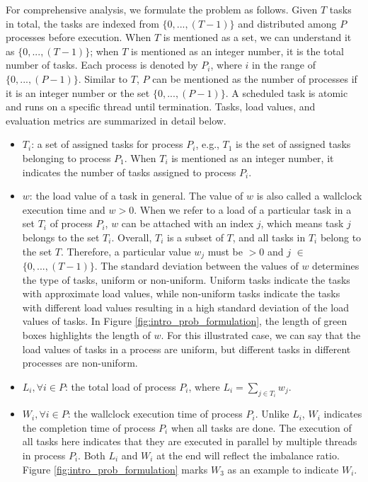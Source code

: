 For comprehensive analysis, we formulate the problem as follows. Given $T$ tasks in total, the tasks are indexed from $\{0,...,(T-1)\}$ and distributed among $P$ processes before execution. When $T$ is mentioned as a set, we can understand it as $\{0,...,(T-1)\}$; when $T$ is mentioned as an integer number, it is the total number of tasks. Each process is denoted by $P_{i}$, where $i$ in the range of $\{0,...,(P-1)\}$. Similar to $T$, $P$ can be mentioned as the number of processes if it is an integer number or the set $\{0,...,(P-1)\}$. A scheduled task is atomic and runs on a specific thread until termination. Tasks, load values, and evaluation metrics are summarized in detail below.
\begin{itemize}
	\item $T_{i}$: a set of assigned tasks for process $P_{i}$, e.g., $T_{1}$ is the set of assigned tasks belonging to process $P_{1}$. When $T_{i}$ is mentioned as an integer number, it indicates the number of tasks assigned to process $P_{i}$.

	\item $w$: the load value of a task in general. The value of $w$ is also called a wallclock execution time and $w > 0$. When we refer to a load of a particular task in a set $T_{i}$ of process $P_{i}$, $w$ can be attached with an index $j$, which means task $j$ belongs to the set $T_{i}$. Overall, $T_{i}$ is a subset of $T$, and all tasks in $T_{i}$ belong to the set $T$. Therefore, a particular value $w_{j}$ must be $> 0$ and $j$ $\in$ $\{0,...,(T-1)\}$. The standard deviation between the values of $w$ determines the type of tasks, uniform or non-uniform. Uniform tasks indicate the tasks with approximate load values, while non-uniform tasks indicate the tasks with different load values resulting in a high standard deviation of the load values of tasks. In Figure \ref{fig:intro_prob_formulation}, the length of green boxes highlights the length of $w$. For this illustrated case, we can say that the load values of tasks in a process are uniform, but different tasks in different processes are non-uniform.
	
	\item $L_{i}, \forall i \in P$: the total load of process $P_{i}$, where $L_{i} = \sum_{j \in T_{i}} w_{j}$.
	
	\item $W_{i}, \forall i \in P$: the wallclock execution time of process $P_{i}$. Unlike $L_{i}$, $W_{i}$ indicates the completion time of process $P_{i}$ when all tasks are done. The execution of all tasks here indicates that they are executed in parallel by multiple threads in process $P_{i}$. Both $L_{i}$ and $W_{i}$ at the end will reflect the imbalance ratio. Figure \ref{fig:intro_prob_formulation} marks $W_{3}$ as an example to indicate $W_{i}$.
	

\end{itemize}
